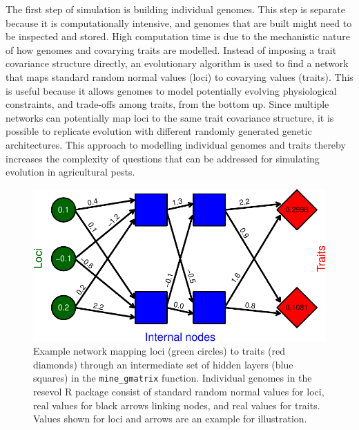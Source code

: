 \documentclass[
]{article}
\begin{document}
The first step of simulation is building individual genomes.
This step is separate because it is computationally intensive, and genomes that are built might need to be inspected and stored.
High computation time is due to the mechanistic nature of how genomes and covarying traits are modelled.
Instead of imposing a trait covariance structure directly, an evolutionary algorithm is used to find a network that maps standard random normal values (loci) to covarying values (traits).
This is useful because it allows genomes to model potentially evolving physiological constraints, and trade-offs among traits, from the bottom up.
Since multiple networks can potentially map loci to the same trait covariance structure, it is possible to replicate evolution with different randomly generated genetic architectures.
This approach to modelling individual genomes and traits thereby increases the complexity of questions that can be addressed for simulating evolution in agricultural pests.

\begin{figure}
\centering
\includegraphics{ms_files/figure-latex/network-1.pdf}
\caption{\label{fig:network}Example network mapping loci (green circles) to traits (red diamonds) through an intermediate set of hidden layers (blue squares) in the \texttt{mine\_gmatrix} function. Individual genomes in the resevol R package consist of standard random normal values for loci, real values for black arrows linking nodes, and real values for traits. Values shown for loci and arrows are an example for illustration.}
\end{figure}
\end{document}
